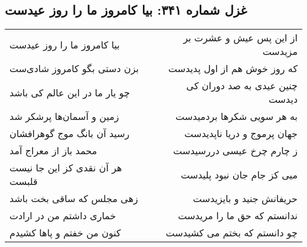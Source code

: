 \begin{center}
\section*{غزل شماره ۳۴۱: بیا کامروز ما را روز عیدست}
\label{sec:0341}
\begin{longtable}{l p{0.5cm} r}
بیا کامروز ما را روز عیدست
&&
از این پس عیش و عشرت بر مزیدست
\\
بزن دستی بگو کامروز شادی‌ست
&&
که روز خوش هم از اول پدیدست
\\
چو یار ما در این عالم کی باشد
&&
چنین عیدی به صد دوران کی دیدست
\\
زمین و آسمان‌ها پرشکر شد
&&
به هر سویی شکرها بردمیدست
\\
رسید آن بانگ موج گوهرافشان
&&
جهان پرموج و دریا ناپدیدست
\\
محمد باز از معراج آمد
&&
ز چارم چرخ عیسی دررسیدست
\\
هر آن نقدی کز این جا نیست قلبست
&&
میی کز جام جان نبود پلیدست
\\
زهی مجلس که ساقی بخت باشد
&&
حریفانش جنید و بایزیدست
\\
خماری داشتم من در ارادت
&&
ندانستم که حق ما را مریدست
\\
کنون من خفتم و پاها کشیدم
&&
چو دانستم که بختم می کشیدست
\\
\end{longtable}
\end{center}
